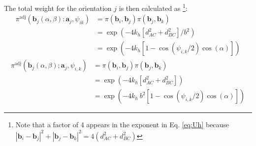            The total weight for the orientation $j$ is then calculated as \footnote{Note that a factor of 4 appears in the exponent in Eq. \eqref{eq:Uh} because $|{\mathbf b}_i - {\mathbf b}_j|^2 + |{\mathbf b}_j - {\mathbf b}_k|^2 = 4 (d_{AC}^2 + d_{BC}^2)$}:
                    \ifkhExplicitP
                        \begin{equation}
                        \label{eq:Uh}
                            \begin{aligned}
                                \pi^\text{adj} \left( {\mathbf b}_j (\alpha, \beta): \mathbf{a}_j, \psi_{ik} \right)  &= \pi({\mathbf b}_i,{\mathbf b}_j)\pi({\mathbf b}_j,{\mathbf b}_k)\\
                                &= \exp\left(-4 k_h [d_{AC}^2 + d_{BC}^2]/b^2\right)\\
                                &= \exp\left(-4 k_h [1 - \cos(\psi_{i,k}/2) \cos(\alpha)]\right)
                            \end{aligned}
                        \end{equation}
                    \else
                        \begin{equation}
                        \label{eq:Uh}
                            \begin{aligned}
                                \pi^\text{adj} \left( {\mathbf b}_j (\alpha, \beta); \mathbf{a}_j, \psi_{i,k} \right)  &= \pi({\mathbf b}_i,{\mathbf b}_j)\pi({\mathbf b}_j,{\mathbf b}_k)\\
                                &= \exp\left(-4 k_h [d_{AC}^2 + d_{BC}^2]\right)\\
                                &= \exp\left(-4k_h~b^2 [1 - \cos(\psi_{i,k}/2) \cos(\alpha)]\right)
                            \end{aligned}
                        \end{equation}
                    \fi

